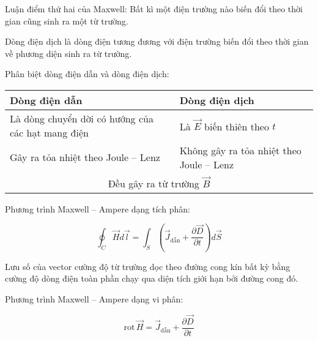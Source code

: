 Luận điểm thứ hai của Maxwell: Bất kì một điện trường nào biến đổi theo thời gian cũng sinh ra một từ trường.

Dòng điện dịch là dòng điện tương đương với điện trường biến đổi theo thời gian về phương diện sinh ra từ trường.

Phân biệt dòng điện dẫn và dòng điện dịch:

\begin{table}[H]
\centering
\begin{tabular}{|p{6cm}p{6cm}|}
\hline
\multicolumn{1}{|p{6cm}|}{ Dòng điện dẫn  }& Dòng điện dịch \\ \hline\hline
\multicolumn{1}{|p{6cm}|}{ Là dòng chuyển dời có hướng của các hạt mang điện  }& Là $\vec{E}$ biến thiên theo $t$ \\ \hline
\multicolumn{1}{|p{6cm}|}{ Gây ra tỏa nhiệt theo Joule -- Lenz  }& Không gây ra tỏa nhiệt theo Joule -- Lenz \\ \hline
\multicolumn{2}{|c|}{Đều gây ra từ trường $\vec{B}$} \\ \hline
\end{tabular}
\end{table}

Phương trình Maxwell -- Ampere dạng tích phân:

\begin{equation*}
  \oint_C \vec{H}d\vec{l} = \int_S \left( \vec{J}_{\text{dẫn}} + \frac{\partial \vec{D}}{\partial t} \right) d\vec{S}
\end{equation*}

Lưu số của vector cường độ từ trường dọc theo đường cong kín bất kỳ bằng cường độ dòng điện toàn phần chạy qua diện tích giới hạn bởi đường cong đó.

Phương trình Maxwell -- Ampere dạng vi phân:

\begin{equation*}
  \text{rot}\,\vec{H} = \vec{J}_{\text{dẫn}} + \frac{\partial \vec{D}}{\partial t}
\end{equation*}